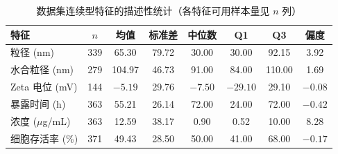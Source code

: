 \begin{table}[H]
  \centering
  \caption{数据集连续型特征的描述性统计（各特征可用样本量见 $n$ 列）}
  \label{tab:senp_feature_statistics}
  \begin{tabular}{lccccccc}
    \hline
    特征 & $n$ & 均值 & 标准差 & 中位数 & Q1 & Q3 & 偏度 \\
    \hline
    粒径 (nm)            & 339 & 65.30  & 79.72  & 30.00  & 30.00  & 92.15   & 3.92  \\
    水合粒径 (nm)        & 279 & 104.97 & 46.73  & 91.00  & 84.00  & 110.00  & 1.69  \\
    Zeta 电位 (mV)       & 144 & $-5.19$ & 29.76  & $-7.50$ & $-29.10$ & 29.10 & $-0.08$ \\
    暴露时间 (h)         & 363 & 55.21  & 26.14  & 72.00  & 24.00  & 72.00   & $-0.42$ \\
    浓度 ($\mu$g/mL)     & 363 & 12.59  & 38.17  & 0.90   & 0.52   & 10.00   & 8.28  \\
    细胞存活率 (\%)      & 371 & 49.43  & 28.50  & 50.00  & 41.00  & 68.00   & $-0.17$ \\
    \hline
  \end{tabular}
\end{table}


